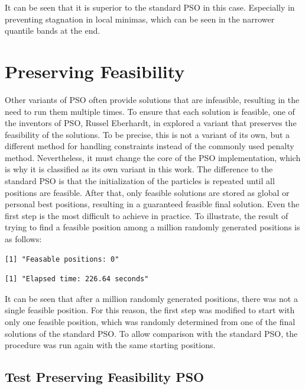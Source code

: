 \documentclass[
  oneside]{book}
\begin{document}
It can be seen that it is superior to the standard PSO in this case. Especially in preventing stagnation in local minimas, which can be seen in the narrower quantile bands at the end.

\hypertarget{preserving-feasibility}{%
\section{Preserving Feasibility}\label{preserving-feasibility}}

Other variants of PSO often provide solutions that are infeasible, resulting in the need to run them multiple times. To ensure that each solution is feasible, one of the inventors of PSO, Russel Eberhardt, in \citep{XiEb2002} explored a variant that preserves the feasibility of the solutions. To be precise, this is not a variant of its own, but a different method for handling constraints instead of the commonly used penalty method. Nevertheless, it must change the core of the PSO implementation, which is why it is classified as its own variant in this work. The difference to the standard PSO is that the initialization of the particles is repeated until all positions are feasible. After that, only feasible solutions are stored as global or personal best positions, resulting in a guaranteed feasible final solution. Even the first step is the most difficult to achieve in practice. To illustrate, the result of trying to find a feasible position among a million randomly generated positions is as follows:

\begin{verbatim}
[1] "Feasable positions: 0"
\end{verbatim}

\begin{verbatim}
[1] "Elapsed time: 226.64 seconds"
\end{verbatim}

It can be seen that after a million randomly generated positions, there was not a single feasible position. For this reason, the first step was modified to start with only one feasible position, which was randomly determined from one of the final solutions of the standard PSO. To allow comparison with the standard PSO, the procedure was run again with the same starting positions.

\hypertarget{test-preserving-feasibility-pso}{%
\subsection{Test Preserving Feasibility PSO}\label{test-preserving-feasibility-pso}}
\end{document}
